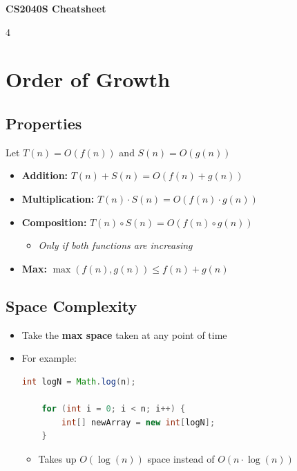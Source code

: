 \documentclass[fontsize=6pt, landscape, a4paper]{scrartcl}
\begin{document}
\begin{center}
    {\Huge \textbf{CS2040S Cheatsheet}}
\end{center}

\begin{multicols*}{4}
    \raggedcolumns
    \section*{Order of Growth}
    \subsection*{Properties}
    Let $T(n) = O(f(n))$ and $S(n) = O(g(n))$
    \begin{itemize}
        \item \textbf{Addition:} $T(n) + S(n) = O(f(n) + g(n))$
        \item \textbf{Multiplication:} $T(n) \cdot S(n) = O(f(n) \cdot g(n))$
        \item \textbf{Composition:} $T(n) \circ S(n) = O(f(n) \circ g(n))$
              \begin{itemize}
                  \item \textit{Only if both functions are increasing}
              \end{itemize}
        \item \textbf{Max:} $\max(f(n), g(n)) \leq f(n) + g(n)$
    \end{itemize}

    \subsection*{Space Complexity}
    \begin{itemize}
        \item Take the \textbf{max space} taken at any point of time
    \end{itemize}

    \begin{itemize}
        \item For example:

              \begin{lstlisting}[language=Java]
    int logN = Math.log(n);
    
    for (int i = 0; i < n; i++) {
        int[] newArray = new int[logN];
    }
    \end{lstlisting}

              \begin{itemize}
                  \item Takes up $O(\log(n))$ space instead of $O(n\cdot \log(n))$
              \end{itemize}
    \end{itemize}


\end{multicols*}
\end{document}
